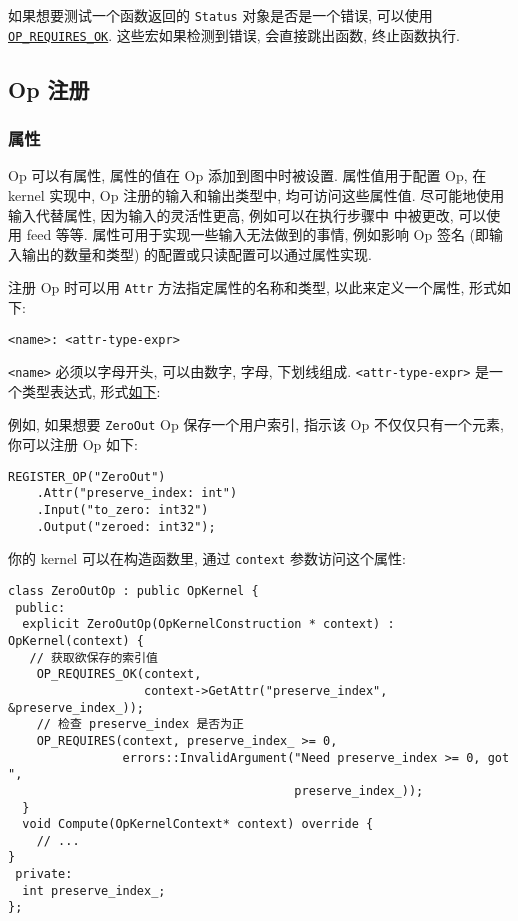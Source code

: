 如果想要测试一个函数返回的 \texttt{Status} 对象是否是一个错误, 可以使用
\href{https://tensorflow.googlesource.com/tensorflow/+/master/tensorflow/core/lib/core/errors.h}{\texttt{OP\_REQUIRES\_OK}}.
这些宏如果检测到错误, 会直接跳出函数, 终止函数执行.

\subsection{Op 注册 }\label{op-ux6ce8ux518c}

\subsubsection{属性 }\label{ux5c5eux6027}

Op 可以有属性, 属性的值在 Op 添加到图中时被设置. 属性值用于配置 Op, 在
kernel 实现中, Op 注册的输入和输出类型中, 均可访问这些属性值.
尽可能地使用输入代替属性, 因为输入的灵活性更高, 例如可以在执行步骤中
中被更改, 可以使用 feed 等等. 属性可用于实现一些输入无法做到的事情,
例如影响 Op 签名 (即输入输出的数量和类型)
的配置或只读配置可以通过属性实现.

注册 Op 时可以用 \texttt{Attr} 方法指定属性的名称和类型,
以此来定义一个属性, 形式如下:

\begin{verbatim}
<name>: <attr-type-expr>
\end{verbatim}

\texttt{\textless{}name\textgreater{}} 必须以字母开头, 可以由数字, 字母,
下划线组成. \texttt{\textless{}attr-type-expr\textgreater{}}
是一个类型表达式, 形式\protect\hyperlink{attr-types}{如下}:

例如, 如果想要 \texttt{ZeroOut} Op 保存一个用户索引, 指示该 Op
不仅仅只有一个元素, 你可以注册 Op 如下:

\begin{verbatim}
REGISTER_OP("ZeroOut")
    .Attr("preserve_index: int")
    .Input("to_zero: int32")
    .Output("zeroed: int32");
\end{verbatim}

你的 kernel 可以在构造函数里, 通过 \texttt{context} 参数访问这个属性:

\begin{verbatim}
class ZeroOutOp : public OpKernel {
 public:
  explicit ZeroOutOp(OpKernelConstruction * context) : OpKernel(context) {
   // 获取欲保存的索引值
    OP_REQUIRES_OK(context,
                   context->GetAttr("preserve_index", &preserve_index_));
    // 检查 preserve_index 是否为正
    OP_REQUIRES(context, preserve_index_ >= 0,
                errors::InvalidArgument("Need preserve_index >= 0, got ",
                                        preserve_index_));
  }
  void Compute(OpKernelContext* context) override {
    // ...
}
 private:
  int preserve_index_;
};
\end{verbatim}

